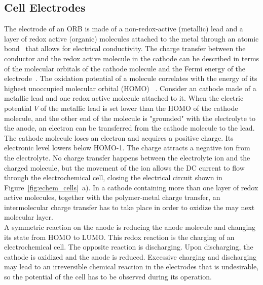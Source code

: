 \subsection{Cell Electrodes}
The electrode of an ORB is made of a non-redox-active (metallic) lead and a layer of redox active (organic) molecules attached to the metal through an atomic bond~\cite{Boiziau1988} that allows for electrical conductivity. The charge transfer between the conductor and the redox active molecule in the cathode can be described in terms of the molecular orbitals of the cathode molecule and the Fermi energy of the electrode~\cite{DOM,Wu_2023,Boiziau1988}. The oxidation potential of a molecule correlates with the energy of its highest unoccupied molecular orbital (HOMO) ~\cite{Sworakowski2018,Wu_2023}. Consider an cathode made of a metallic lead and one redox active molecule attached to it. When the electric potential $V$ of the metallic lead is set lower than the HOMO of the cathode molecule, and the other end of the molecule is "grounded" with the electrolyte to the anode, an electron can be transferred from the cathode molecule to the lead. The cathode molecule loses an electron and acquires a positive charge. Its electronic level lowers below HOMO-1. The charge attracts a negative ion from the electrolyte. No charge transfer happens between the electrolyte ion and the charged molecule, but the movement of the ion allows the DC current to flow through the electrochemical cell, closing the electrical circuit shown in Figure~\ref{fig:echem_cells}~a). In a cathode containing more than one layer of redox active molecules, together with the polymer-metal charge transfer, an intermolecular charge transfer has to take place in order to oxidize the may next molecular layer.\\ 
A symmetric reaction on the anode is reducing the anode molecule and changing its state from HOMO to LUMO. This redox reaction is the charging of an electrochemical cell. The opposite reaction is discharging. Upon discharging, the cathode is oxidized and the anode is reduced. Excessive charging and discharging may lead to an irreversible chemical reaction in the electrodes that is undesirable, so the potential of the cell has to be observed during its operation.\\

